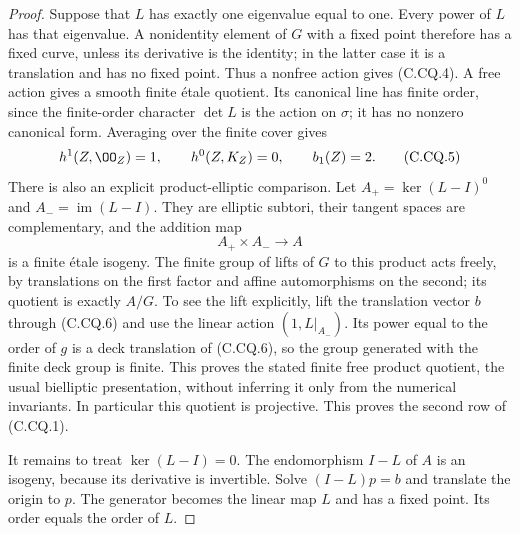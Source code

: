 \begin{proof}
Suppose that $L$ has exactly one eigenvalue equal to
one. Every power of $L$ has that eigenvalue. A
nonidentity element of $G$ with a fixed point therefore
has a fixed curve, unless its derivative is the
identity; in the latter case it is a translation and
has no fixed point. Thus a nonfree action gives
(C.CQ.4). A free action gives a smooth finite
\'etale quotient. Its canonical line has finite order,
since the finite-order character $\det L$ is the
action on $\sigma$; it has no nonzero canonical
form. Averaging over the finite cover gives
\[
 h^1(Z,\OO_Z)=1,\qquad h^0(Z,K_Z)=0,\qquad
                  b_1(Z)=2 .
                                                               \tag{C.CQ.5}
\]
There is also an explicit product-elliptic comparison.
Let
$A_+=\ker(L-I)^0$ and $A_-=\operatorname{im}(L-I)$.
They are elliptic subtori, their tangent spaces are
complementary, and the addition map
\[
                  A_+\times A_-\longrightarrow A
                                                               \tag{C.CQ.6}
\]
is a finite \'etale isogeny. The finite group of lifts
of $G$ to this product acts freely, by translations
on the first factor and affine automorphisms on the
second; its quotient is exactly $A/G$. To see the
lift explicitly, lift the translation vector $b$
through (C.CQ.6) and use the linear action
$(1,L|_{A_-})$. Its power equal to the order of $g$
is a deck translation of (C.CQ.6), so the group
generated with the finite deck group is finite.
This proves the stated finite free product quotient,
the usual bielliptic presentation, without inferring
it only from the numerical invariants. In particular
this quotient is projective. This proves the second
row of (C.CQ.1).

It remains to treat $\ker(L-I)=0$. The endomorphism
$I-L$ of $A$ is an isogeny, because its derivative
is invertible. Solve $(I-L)p=b$ and translate the
origin to $p$. The generator becomes the linear
map $L$ and has a fixed point. Its order equals
the order of $L$.


\end{proof}
